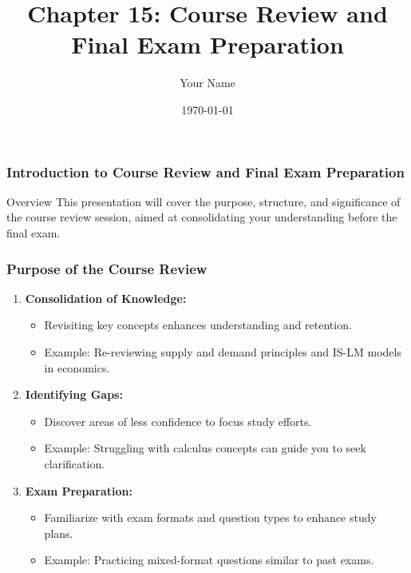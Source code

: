 \documentclass{beamer}
\title{Chapter 15: Course Review and Final Exam Preparation}
\author{Your Name}
\institute{Your Institution}
\date{\today}
\begin{document}
\frame{\titlepage}

\begin{frame}[fragile]
    \frametitle{Introduction to Course Review and Final Exam Preparation}
    \begin{block}{Overview}
        This presentation will cover the purpose, structure, and significance of the course review session, 
        aimed at consolidating your understanding before the final exam.
    \end{block}
\end{frame}

\begin{frame}[fragile]
    \frametitle{Purpose of the Course Review}
    \begin{enumerate}
        \item \textbf{Consolidation of Knowledge:}
        \begin{itemize}
            \item Revisiting key concepts enhances understanding and retention.
            \item Example: Re-reviewing supply and demand principles and IS-LM models in economics.
        \end{itemize}

        \item \textbf{Identifying Gaps:}
        \begin{itemize}
            \item Discover areas of less confidence to focus study efforts.
            \item Example: Struggling with calculus concepts can guide you to seek clarification.
        \end{itemize}

        \item \textbf{Exam Preparation:}
        \begin{itemize}
            \item Familiarize with exam formats and question types to enhance study plans.
            \item Example: Practicing mixed-format questions similar to past exams.
        \end{itemize}
    \end{enumerate}
\end{frame}
\end{document}
